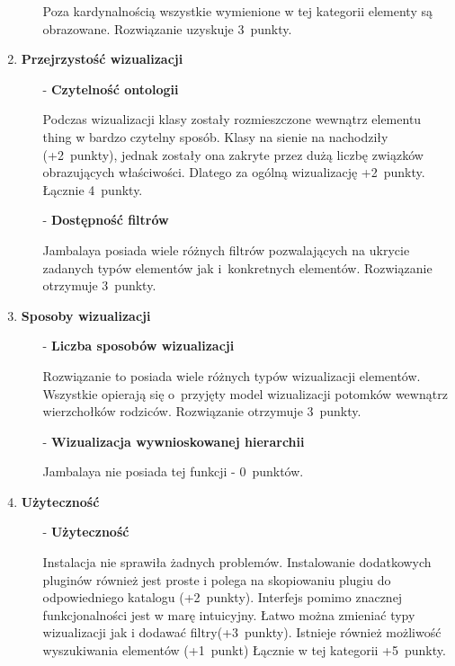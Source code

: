 \begin{enumerate}
\begin{itemize}
  \nopagebreak
Poza kardynalnością wszystkie wymienione w tej kategorii elementy są obrazowane. Rozwiązanie uzyskuje 3~punkty.
  \end{itemize}

\item{\bf Przejrzystość wizualizacji}
\begin{itemize}
 \item[-]{\bf Czytelność ontologii} 

  \nopagebreak
Podczas wizualizacji klasy zostały rozmieszczone wewnątrz elementu thing w bardzo czytelny sposób. Klasy na sienie na nachodziły (+2~punkty),
 jednak zostały ona zakryte przez dużą liczbę związków obrazujących właściwości. Dlatego za ogólną wizualizację +2~punkty. Łącznie 4~punkty.


 \item[-]{\bf Dostępność filtrów} 

  \nopagebreak
Jambalaya posiada wiele różnych filtrów pozwalających na ukrycie zadanych typów elementów jak i~konkretnych elementów. Rozwiązanie otrzymuje 3~punkty.



\end{itemize}

\item{\bf Sposoby wizualizacji}
\begin{itemize}
 \item[-]{\bf Liczba sposobów wizualizacji } 

  \nopagebreak
Rozwiązanie to posiada wiele różnych typów wizualizacji elementów. Wszystkie opierają się o~przyjęty model wizualizacji potomków wewnątrz
 wierzchołków rodziców. Rozwiązanie otrzymuje 3~punkty.

 

 \item[-]{\bf  Wizualizacja wywnioskowanej hierarchii } 

  \nopagebreak
Jambalaya nie posiada tej funkcji - 0~punktów. 

\end{itemize}


\item{\bf Użyteczność}
\begin{itemize}
 \item[-]{\bf Użyteczność  } 

  \nopagebreak
Instalacja \proteges nie sprawiła żadnych problemów. Instalowanie dodatkowych pluginów również jest proste i polega na skopiowaniu plugiu do 
odpowiedniego katalogu (+2~punkty). Interfejs pomimo znacznej funkcjonalności jest w marę intuicyjny. Łatwo można zmieniać typy 
wizualizacji jak i dodawać filtry(+3~punkty). Istnieje również możliwość wyszukiwania elementów (+1~punkt)  Łącznie w tej kategorii +5~punkty.


\end{itemize}
\end{enumerate}
